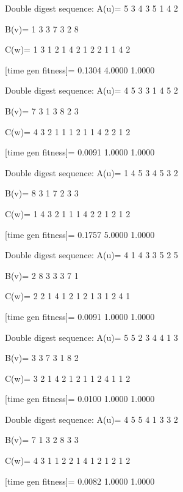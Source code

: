 Double digest sequence:
A(u)=
     5     3     4     3     5     1     4     2

B(v)=
     1     3     3     7     3     2     8

C(w)=
     1     3     1     2     1     4     2     1     2     2     1     1     4     2

[time gen fitness]=
    0.1304    4.0000    1.0000

Double digest sequence:
A(u)=
     4     5     3     3     1     4     5     2

B(v)=
     7     3     1     3     8     2     3

C(w)=
     4     3     2     1     1     1     2     1     1     4     2     2     1     2

[time gen fitness]=
    0.0091    1.0000    1.0000

Double digest sequence:
A(u)=
     1     4     5     3     4     5     3     2

B(v)=
     8     3     1     7     2     3     3

C(w)=
     1     4     3     2     1     1     1     4     2     2     1     2     1     2

[time gen fitness]=
    0.1757    5.0000    1.0000

Double digest sequence:
A(u)=
     4     1     4     3     3     5     2     5

B(v)=
     2     8     3     3     3     7     1

C(w)=
     2     2     1     4     1     2     1     2     1     3     1     2     4     1

[time gen fitness]=
    0.0091    1.0000    1.0000

Double digest sequence:
A(u)=
     5     5     2     3     4     4     1     3

B(v)=
     3     3     7     3     1     8     2

C(w)=
     3     2     1     4     2     1     2     1     1     2     4     1     1     2

[time gen fitness]=
    0.0100    1.0000    1.0000

Double digest sequence:
A(u)=
     4     5     5     4     1     3     3     2

B(v)=
     7     1     3     2     8     3     3

C(w)=
     4     3     1     1     2     2     1     4     1     2     1     2     1     2

[time gen fitness]=
    0.0082    1.0000    1.0000

